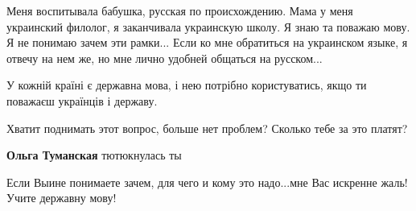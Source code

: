 
Меня воспитывала бабушка, русская по происхождению. Мама у меня украинский
филолог, я заканчивала украинскую школу. Я знаю та поважаю мову. Я не понимаю
зачем эти рамки... Если ко мне обратиться на украинском языке, я отвечу на нем
же, но мне лично удобней общаться на русском...

У кожній країні є державна мова, і нею потрібно користуватись, якщо ти поважаєш
українців і державу.

Хватит поднимать этот вопрос, больше нет проблем? Сколько тебе за это платят?

\textbf{Ольга Туманская} тютюкнулась ты


Если Выине понимаете зачем, для чего и кому это надо...мне Вас искренне
жаль!Учите державну мову!

